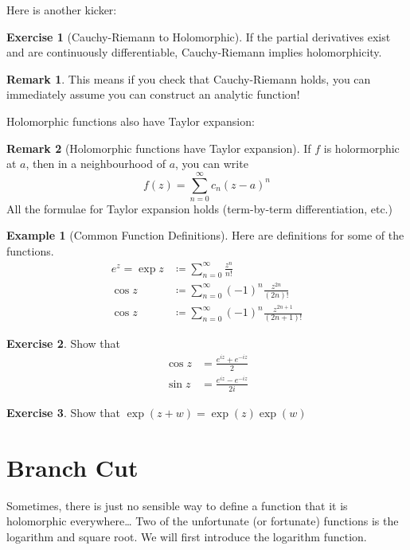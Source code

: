 \documentclass[a4paper, 12pt]{article}
\theoremstyle{definition}
\newtheorem{exercise}{Exercise}
\newtheorem{example}{Example}
\newtheorem{remark}{Remark}
\numberwithin{theorem}{section}
\numberwithin{definition}{section}
\numberwithin{exercise}{section}
\numberwithin{remark}{section}
\numberwithin{figure}{section}
\numberwithin{example}{section}
\begin{document}
Here is another kicker:
\begin{exercise}[Cauchy-Riemann to Holomorphic]
    If the partial derivatives exist and are continuously differentiable,
    Cauchy-Riemann implies holomorphicity.
\end{exercise}
\begin{remark}
    This means if you check that Cauchy-Riemann holds, you can immediately assume you can construct an analytic function!
\end{remark}
Holomorphic functions also have Taylor expansion:
\begin{remark}[Holomorphic functions have Taylor expansion]
    If $f$ is holormorphic at $a$, then
    in a neighbourhood of $a$, you can write
    \begin{equation*}
        f(z) = \sum_{n=0}^{\infty} c_n \left( z-a \right)^n
    \end{equation*}
    All the formulae for Taylor expansion holds (term-by-term differentiation, etc.)
\end{remark}
\begin{example}[Common Function Definitions]
    Here are definitions for some of the functions.
    \begin{align*}
        e^z = \exp z &\coloneqq \sum_{n=0}^{\infty} \frac{z^n}{n!} \\
        \cos{z} &\coloneqq \sum_{n=0}^{\infty} \left( -1 \right)^n \frac{z^{2n}}{\left( 2n \right)!} \\
        \cos{z} &\coloneqq \sum_{n=0}^{\infty} \left( -1 \right)^n \frac{z^{2n+1}}{\left( 2n + 1\right)!}
    \end{align*}
\end{example}
\begin{exercise}
    Show that
    \begin{align*}
        \cos{z} &= \frac{e^{iz} + e^{-iz}}{2} \\
        \sin{z} &= \frac{e^{iz} - e^{-iz}}{2i}
    \end{align*}
\end{exercise}
\begin{exercise}
    Show that $\exp \left( z+w \right) = \exp (z) \exp (w)$
\end{exercise}
\section{Branch Cut}
Sometimes, there is just no sensible way to define a function that it is holomorphic everywhere\dots
Two of the unfortunate (or fortunate) functions is the logarithm and square root.
We will first introduce the logarithm function.
\end{document}
